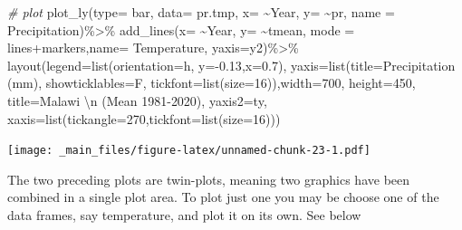 \documentclass[
]{book}
\newenvironment{Shaded}{\begin{snugshade}}{\end{snugshade}}
\newcommand{\AttributeTok}[1]{\textcolor[rgb]{0.77,0.63,0.00}{#1}}
\newcommand{\CommentTok}[1]{\textcolor[rgb]{0.56,0.35,0.01}{\textit{#1}}}
\newcommand{\DecValTok}[1]{\textcolor[rgb]{0.00,0.00,0.81}{#1}}
\newcommand{\FloatTok}[1]{\textcolor[rgb]{0.00,0.00,0.81}{#1}}
\newcommand{\FunctionTok}[1]{\textcolor[rgb]{0.00,0.00,0.00}{#1}}
\newcommand{\NormalTok}[1]{#1}
\newcommand{\SpecialCharTok}[1]{\textcolor[rgb]{0.00,0.00,0.00}{#1}}
\newcommand{\StringTok}[1]{\textcolor[rgb]{0.31,0.60,0.02}{#1}}
\begin{document}
\begin{Shaded}
\begin{Highlighting}[]
\CommentTok{\# plot }
\FunctionTok{plot\_ly}\NormalTok{(}\AttributeTok{type=} \StringTok{\textquotesingle{}bar\textquotesingle{}}\NormalTok{, }\AttributeTok{data=}\NormalTok{ pr.tmp, }\AttributeTok{x=} \SpecialCharTok{\textasciitilde{}}\NormalTok{Year, }\AttributeTok{y=} \SpecialCharTok{\textasciitilde{}}\NormalTok{pr, }\AttributeTok{name =} \StringTok{\textquotesingle{}Precipitation\textquotesingle{}}\NormalTok{)}\SpecialCharTok{\%\textgreater{}\%}
 \FunctionTok{add\_lines}\NormalTok{(}\AttributeTok{x=} \SpecialCharTok{\textasciitilde{}}\NormalTok{Year, }\AttributeTok{y=} \SpecialCharTok{\textasciitilde{}}\NormalTok{tmean, }\AttributeTok{mode =} \StringTok{\textquotesingle{}lines+markers\textquotesingle{}}\NormalTok{,}\AttributeTok{name=} \StringTok{\textquotesingle{}Temperature\textquotesingle{}}\NormalTok{,}
           \AttributeTok{yaxis=}\StringTok{\textquotesingle{}y2\textquotesingle{}}\NormalTok{)}\SpecialCharTok{\%\textgreater{}\%}
    \FunctionTok{layout}\NormalTok{(}\AttributeTok{legend=}\FunctionTok{list}\NormalTok{(}\AttributeTok{orientation=}\StringTok{\textquotesingle{}h\textquotesingle{}}\NormalTok{, }\AttributeTok{y=}\SpecialCharTok{{-}}\FloatTok{0.13}\NormalTok{,}\AttributeTok{x=}\FloatTok{0.7}\NormalTok{), }
                   \AttributeTok{yaxis=}\FunctionTok{list}\NormalTok{(}\AttributeTok{title=}\StringTok{\textquotesingle{}Precipitation (mm)\textquotesingle{}}\NormalTok{,}
                              \AttributeTok{showticklables=}\NormalTok{F, }\AttributeTok{tickfont=}\FunctionTok{list}\NormalTok{(}\AttributeTok{size=}\DecValTok{16}\NormalTok{)),}\AttributeTok{width=}\DecValTok{700}\NormalTok{, }
           \AttributeTok{height=}\DecValTok{450}\NormalTok{, }\AttributeTok{title=}\StringTok{\textquotesingle{}Malawi }\SpecialCharTok{\textbackslash{}n}\StringTok{ (Mean 1981{-}2020)\textquotesingle{}}\NormalTok{, }
                   \AttributeTok{yaxis2=}\NormalTok{ty, }\AttributeTok{xaxis=}\FunctionTok{list}\NormalTok{(}\AttributeTok{tickangle=}\DecValTok{270}\NormalTok{,}\AttributeTok{tickfont=}\FunctionTok{list}\NormalTok{(}\AttributeTok{size=}\DecValTok{16}\NormalTok{)))}
\end{Highlighting}
\end{Shaded}

\texttt{[image: \_main\_files/figure-latex/unnamed-chunk-23-1.pdf]}

The two preceding plots are twin-plots, meaning two graphics have been combined in a single plot area.
To plot just one you may be choose one of the data frames, say temperature, and plot it on its own. See below
\end{document}
